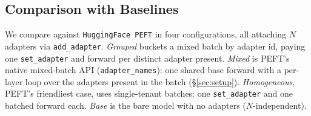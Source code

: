 \documentclass[11pt]{article}
\newcommand{\sysname}{LateFuse}
\begin{document}
\subsection{Comparison with Baselines}
\label{sec:results_baselines}

We compare against \texttt{HuggingFace PEFT} in four
configurations, all attaching $N$ adapters via \texttt{add\_adapter}.
\emph{Grouped} buckets a mixed batch by adapter id, paying one
\texttt{set\_adapter} and forward per distinct adapter present. \emph{Mixed} is
PEFT's native mixed-batch API
(\texttt{adapter\_names}): one shared base forward with a per-layer loop over
the adapters present in the batch (\S\ref{sec:setup}).
\emph{Homogeneous}, PEFT's friendliest case, uses
single-tenant batches: one \texttt{set\_adapter} and one batched forward each.
\emph{Base} is the bare model with no adapters ($N$-independent).

\begin{table}[h]
  \centering
  \footnotesize
  \setlength{\tabcolsep}{1.5pt}
  \renewcommand{\arraystretch}{0.95}
  \caption{Latency/throughput vs.\ PEFT in the four configurations of
    \S\ref{sec:results_baselines} ($r{=}\HeadlineRank$; PEFT measured at
    $\mathcal{B}\in\{8,32,128\}$). Speedup rows are QPS ratios (QPS column)
  of \sysname{} over the like-for-like \emph{mixed} baseline.}
  \label{tab:baselines}
  
\end{table}

\begin{table}[!t]
  \centering
  \footnotesize
  \setlength{\tabcolsep}{5pt}
  \renewcommand{\arraystretch}{0.95}
  \caption{\sysname{} across encoders and GPU classes (protocol:
    \S\ref{sec:setup}). $\Delta$p50: p50 at each configuration's tenant ceiling
    versus $N{=}1{,}000$. \emph{Spread}: max$-$min p50 over the sweep.
    \emph{vs.\ PEFT}: throughput ratio over PEFT's mixed-batch API, on cells
    where it runs. $^{\dagger}$the configuration of
  \S\ref{sec:results_latency}--\ref{sec:results_baselines}.}
  \label{tab:generalization}
  
\end{table}
\end{document}
